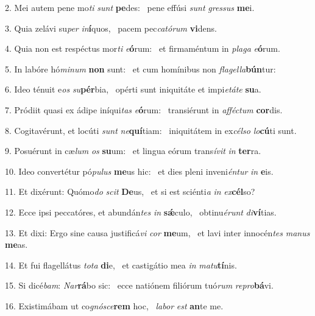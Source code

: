 2. Mei autem pene mo\textit{ti} \textit{sunt} \textbf{pe}des: \ast\  pene effúsi \textit{sunt} \textit{gres}\textit{sus} \textbf{me}i.\

3. Quia zelávi su\textit{per} \textit{in}\textbf{í}quos, \ast\  pacem pec\textit{ca}\textit{tó}\textit{rum} \textbf{vi}dens.\

4. Quia non est respéctus mor\textit{ti} \textit{e}\textbf{ó}rum: \ast\  et firmaméntum in \textit{pla}\textit{ga} \textit{e}\textbf{ó}rum.\

5. In labóre hó\textit{mi}\textit{num} \textbf{non} sunt: \ast\  et cum homínibus non \textit{fla}\textit{gel}\textit{la}\textbf{bún}tur:\

6. Ideo ténuit e\textit{os} \textit{su}\textbf{pér}bia, \ast\  opérti sunt iniquitáte et impi\textit{e}\textit{tá}\textit{te} \textbf{su}a.\

7. Pródiit quasi ex ádipe iníqui\textit{tas} \textit{e}\textbf{ó}rum: \ast\  transiérunt in \textit{af}\textit{féc}\textit{tum} \textbf{cor}dis.\

8. Cogitavérunt, et locúti \textit{sunt} \textit{ne}\textbf{quí}tiam: \ast\  iniquitátem in ex\textit{cél}\textit{so} \textit{lo}\textbf{cú}ti sunt.\

9. Posuérunt in cæ\textit{lum} \textit{os} \textbf{su}um: \ast\  et lingua eórum trans\textit{í}\textit{vit} \textit{in} \textbf{ter}ra.\

10. Ideo convertétur pó\textit{pu}\textit{lus} \textbf{me}us hic: \ast\  et dies pleni inveni\textit{én}\textit{tur} \textit{in} \textbf{e}is.\

11. Et dixérunt: Quómo\textit{do} \textit{scit} \textbf{De}us, \ast\  et si est sciénti\textit{a} \textit{in} \textit{ex}\textbf{cél}so?\

12. Ecce ipsi peccatóres, et abundán\textit{tes} \textit{in} \textbf{sǽ}culo, \ast\  obtinu\textit{é}\textit{runt} \textit{di}\textbf{ví}tias.\

13. Et dixi: Ergo sine causa justificá\textit{vi} \textit{cor} \textbf{me}um, \ast\  et lavi inter innocén\textit{tes} \textit{ma}\textit{nus} \textbf{me}as.\

14. Et fui flagellátus \textit{to}\textit{ta} \textbf{di}e, \ast\  et castigátio mea \textit{in} \textit{ma}\textit{tu}\textbf{tí}nis.\

15. Si dicé\textit{bam}: \textit{Nar}\textbf{rá}bo sic: \ast\  ecce natiónem filiórum tuó\textit{rum} \textit{re}\textit{pro}\textbf{bá}vi.\

16. Existimábam ut co\textit{gnó}\textit{sce}\textbf{rem} hoc, \ast\  \textit{la}\textit{bor} \textit{est} \textbf{an}te me.\


